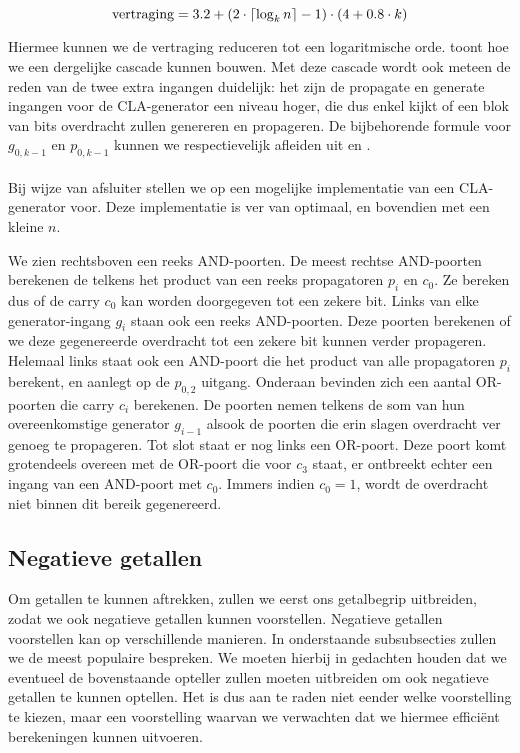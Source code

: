 \begin{equation}
\mbox{vertraging}=3.2+\left( 2\cdot\left\lceil \log_kn \right\rceil-1 \right)\cdot\left( 4+0.8\cdot k \right)
\end{equation}

Hiermee kunnen we de vertraging reduceren tot een logaritmische orde.  toont hoe we een dergelijke cascade kunnen bouwen. Met deze cascade wordt ook meteen de reden van de twee extra ingangen duidelijk: het zijn de propagate en generate ingangen voor de CLA-generator een niveau hoger, die dus enkel kijkt of een blok van bits overdracht zullen genereren en propageren. De bijbehorende formule voor $g_{0,k-1}$ en $p_{0,k-1}$ kunnen we respectievelijk afleiden uit  en .

\paragraph{}
Bij wijze van afsluiter stellen we op  een mogelijke implementatie van een CLA-generator voor. Deze implementatie is ver van optimaal, en bovendien met een kleine $n$.


We zien rechtsboven een reeks AND-poorten. De meest rechtse AND-poorten berekenen de telkens het product van een reeks propagatoren $p_i$ en $c_0$. Ze bereken dus of de carry $c_0$ kan worden doorgegeven tot een zekere bit. Links van elke generator-ingang $g_i$ staan ook een reeks AND-poorten. Deze poorten berekenen of we deze gegenereerde overdracht tot een zekere bit kunnen verder propageren. Helemaal links staat ook een AND-poort die het product van alle propagatoren $p_i$ berekent, en aanlegt op de $p_{0,2}$ uitgang. Onderaan bevinden zich een aantal OR-poorten die carry $c_i$ berekenen. De poorten nemen telkens de som van hun overeenkomstige generator $g_{i-1}$ alsook de poorten die erin slagen overdracht ver genoeg te propageren. Tot slot staat er nog links een OR-poort. Deze poort komt grotendeels overeen met de OR-poort die voor $c_3$ staat, er ontbreekt echter een ingang van een AND-poort met $c_0$. Immers indien $c_0=1$, wordt de overdracht niet binnen dit bereik gegenereerd.

\subsection{Negatieve getallen}
Om getallen te kunnen aftrekken, zullen we eerst ons getalbegrip uitbreiden, zodat we ook negatieve getallen kunnen voorstellen. Negatieve getallen voorstellen kan op verschillende manieren. In onderstaande subsubsecties zullen we de meest populaire bespreken. We moeten hierbij in gedachten houden dat we eventueel de bovenstaande opteller zullen moeten uitbreiden om ook negatieve getallen te kunnen optellen. Het is dus aan te raden niet eender welke voorstelling te kiezen, maar een voorstelling waarvan we verwachten dat we hiermee effici\"ent berekeningen kunnen uitvoeren.

